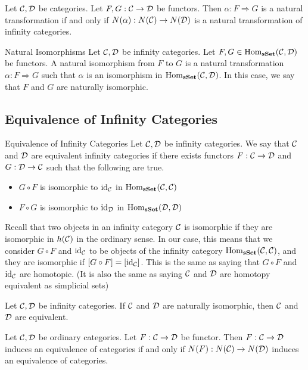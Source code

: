 \documentclass[a4paper]{article}
\begin{document}
\begin{lmm}{}{} Let $\mathcal{C},\mathcal{D}$ be categories. Let $F,G:\mathcal{C}\to\mathcal{D}$ be functors. Then $\alpha:F\Rightarrow G$ is a natural transformation if and only if $N(\alpha):N(\mathcal{C})\to N(\mathcal{D})$ is a natural transformation of infinity categories. 
\end{lmm}

\begin{defn}{Natural Isomorphisms}{} Let $\mathcal{C},\mathcal{D}$ be infinity categories. Let $F,G\in\operatorname{Hom}_\bold{sSet}(\mathcal{C},\mathcal{D})$ be functors. A natural isomorphism from $F$ to $G$ is a natural transformation $\alpha:F\Rightarrow G$ such that $\alpha$ is an isomorphism in $\operatorname{Hom}_\bold{sSet}(\mathcal{C},\mathcal{D})$. In this case, we say that $F$ and $G$ are naturally isomorphic. 
\end{defn}

\subsection{Equivalence of Infinity Categories}
\begin{defn}{Equivalence of Infinity Categories}{} Let $\mathcal{C},\mathcal{D}$ be infinity categories. We say that $\mathcal{C}$ and $\mathcal{D}$ are equivalent infinity categories if there exists functors $F:\mathcal{C}\to\mathcal{D}$ and $G:\mathcal{D}\to\mathcal{C}$ such that the following are true. 
\begin{itemize}
\item $G\circ F$ is isomorphic to $\text{id}_{\mathcal{C}}$ in $\operatorname{Hom}_\bold{sSet}(\mathcal{C},\mathcal{C})$
\item $F\circ G$ is isomorphic to $\text{id}_{\mathcal{D}}$ in $\operatorname{Hom}_\bold{sSet}(\mathcal{D},\mathcal{D})$
\end{itemize}
\end{defn}

Recall that two objects in an infinity category $\mathcal{C}$ is isomorphic if they are isomorphic in $h(\mathcal{C})$ in the ordinary sense. In our case, this means that we consider $G\circ F$ and $\text{id}_{\mathcal{C}}$ to be objects of the infinity category $\operatorname{Hom}_\bold{sSet}(\mathcal{C},\mathcal{C})$, and they are isomorphic if $[G\circ F]=[\text{id}_{\mathcal{C}}]$. This is the same as saying that $G\circ F$ and $\text{id}_{\mathcal{C}}$ are homotopic. (It is also the same as saying $\mathcal{C}$ and $\mathcal{D}$ are homotopy equivalent as simplicial sets)

\begin{lmm}{}{} Let $\mathcal{C},\mathcal{D}$ be infinity categories. If $\mathcal{C}$ and $\mathcal{D}$ are naturally isomorphic, then $\mathcal{C}$ and $\mathcal{D}$ are equivalent. 
\end{lmm}

\begin{prp}{}{} Let $\mathcal{C},\mathcal{D}$ be ordinary categories. Let $F:\mathcal{C}\to\mathcal{D}$ be functor. Then $F:\mathcal{C}\to\mathcal{D}$ induces an equivalence of categories if and only if $N(F):N(\mathcal{C})\to N(\mathcal{D})$ induces an equivalence of categories. 
\end{prp}
\end{document}

